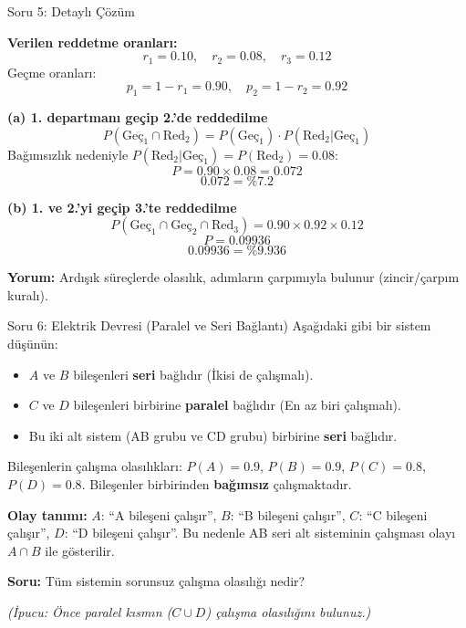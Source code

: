 \documentclass[light]{lutbeamer}
\begin{document}
\begin{frame}[allowframebreaks]{Soru 5: Detaylı Çözüm}
    \scriptsize
    {\color{red}
    \textbf{Verilen reddetme oranları:}
    \[
    r_1=0.10,\quad r_2=0.08,\quad r_3=0.12
    \]
    Geçme oranları:
    \[
    p_1=1-r_1=0.90,\quad p_2=1-r_2=0.92
    \]
    
    \vspace{0.1cm}
    \textbf{(a) 1. departmanı geçip 2.'de reddedilme}
    \[
    P(\text{Geç}_1 \cap \text{Red}_2)=P(\text{Geç}_1)\cdot P(\text{Red}_2|\text{Geç}_1)
    \]
    Bağımsızlık nedeniyle $P(\text{Red}_2|\text{Geç}_1)=P(\text{Red}_2)=0.08$:
    \[
    P=0.90\times 0.08=0.072
    \]
    \[
    \boxed{0.072=\%7.2}
    \]
    
    \vspace{0.1cm}
    \textbf{(b) 1. ve 2.'yi geçip 3.'te reddedilme}
    \[
    P(\text{Geç}_1 \cap \text{Geç}_2 \cap \text{Red}_3)=0.90\times 0.92\times 0.12
    \]
    \[
    P=0.09936
    \]
    \[
    \boxed{0.09936=\%9.936}
    \]
    
    \vspace{0.1cm}
    \textbf{Yorum:} Ardışık süreçlerde olasılık, adımların çarpımıyla bulunur (zincir/çarpım kuralı).
    }
\end{frame}

\begin{frame}{Soru 6: Elektrik Devresi (Paralel ve Seri Bağlantı)}
    Aşağıdaki gibi bir sistem düşünün:
    \begin{itemize}
        \item $A$ ve $B$ bileşenleri \textbf{seri} bağlıdır (İkisi de çalışmalı).
        \item $C$ ve $D$ bileşenleri birbirine \textbf{paralel} bağlıdır (En az biri çalışmalı).
        \item Bu iki alt sistem (AB grubu ve CD grubu) birbirine \textbf{seri} bağlıdır.
    \end{itemize}
    
    Bileşenlerin çalışma olasılıkları: $P(A)=0.9$, $P(B)=0.9$, $P(C)=0.8$, $P(D)=0.8$. Bileşenler birbirinden \textbf{bağımsız} çalışmaktadır.
    
    \textbf{Olay tanımı:} $A$: ``A bileşeni çalışır'', $B$: ``B bileşeni çalışır'', $C$: ``C bileşeni çalışır'', $D$: ``D bileşeni çalışır''.
    Bu nedenle AB seri alt sisteminin çalışması olayı $A \cap B$ ile gösterilir.
    
    \vspace{0.2cm}
    \textbf{Soru:} Tüm sistemin sorunsuz çalışma olasılığı nedir?
    
    \textit{(İpucu: Önce paralel kısmın ($C \cup D$) çalışma olasılığını bulunuz.)}
\end{frame}
\end{document}
